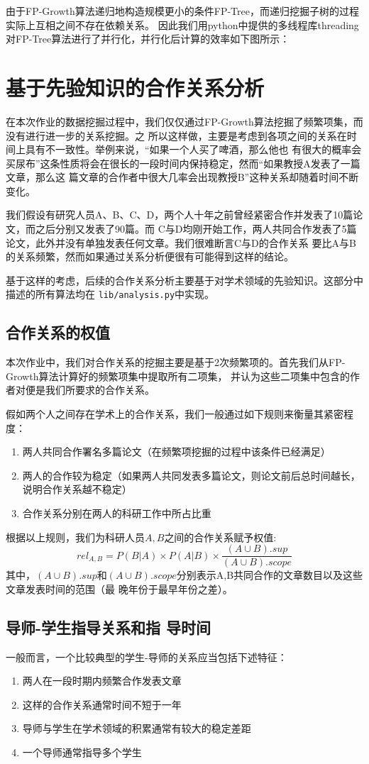 \documentclass[a4paper]{article}
\begin{document}
由于FP-Growth算法递归地构造规模更小的条件FP-Tree，而递归挖掘子树的过程实际上互相之间不存在依赖关系。
因此我们用python中提供的多线程库threading对FP-Tree算法进行了并行化，并行化后计算的效率如下图所示：

\section{基于先验知识的合作关系分析}
在本次作业的数据挖掘过程中，我们仅仅通过FP-Growth算法挖掘了频繁项集，而没有进行进一步的关系挖掘。之
所以这样做，主要是考虑到各项之间的关系在时间上具有不一致性。举例来说，``如果一个人买了啤酒，那么他也
有很大的概率会买尿布''这条性质将会在很长的一段时间内保持稳定，然而``如果教授A发表了一篇文章，那么这
篇文章的合作者中很大几率会出现教授B''这种关系却随着时间不断变化。

我们假设有研究人员A、B、C、D，两个人十年之前曾经紧密合作并发表了10篇论文，而之后分别又发表了90篇。而
C与D均刚开始工作，两人共同合作发表了5篇论文，此外并没有单独发表任何文章。我们很难断言C与D的合作关系
要比A与B的关系频繁，然而如果通过关系分析便很有可能得到这样的结论。

基于这样的考虑，后续的合作关系分析主要基于对学术领域的先验知识。这部分中描述的所有算法均在
\texttt{lib/analysis.py}中实现。

\subsection{合作关系的权值}
本次作业中，我们对合作关系的挖掘主要是基于2次频繁项的。首先我们从FP-Growth算法计算好的频繁项集中提取所有二项集，
并认为这些二项集中包含的作者对便是我们所要求的合作关系。

假如两个人之间存在学术上的合作关系，我们一般通过如下规则来衡量其紧密程度：
\begin{enumerate}
  \item 两人共同合作署名多篇论文（在频繁项挖掘的过程中该条件已经满足）
  \item 两人的合作较为稳定（如果两人共同发表多篇论文，则论文前后总时间越长，说明合作关系越不稳定）
  \item 合作关系分别在两人的科研工作中所占比重
\end{enumerate}
根据以上规则，我们为科研人员$A,B$之间的合作关系赋予权值:
\[
rel_{A,B}=P(B|A)\times P(A|B)\times \frac{(A\cup B).sup}{(A\cup B).scope}
\]
其中，$(A\cup B).sup$和$(A\cup B).scope$分别表示A,B共同合作的文章数目以及这些文章发表时间的范围（最
晚年份于最早年份之差）。

\subsection{导师-学生指导关系和指 导时间}
一般而言，一个比较典型的学生-导师的关系应当包括下述特征：
\begin{enumerate}
  \item 两人在一段时期内频繁合作发表文章
  \item 这样的合作关系通常时间不短于一年
  \item 导师与学生在学术领域的积累通常有较大的稳定差距
  \item 一个导师通常指导多个学生
\end{enumerate}
\end{document}
